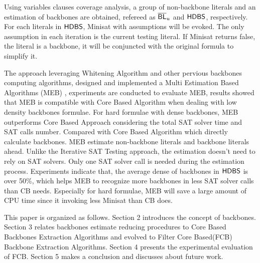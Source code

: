 Using variables clauses coverage analysis, a group of non-backbone literals and an estimation of backbones are obtained, refereed as $\overline{\textsf{BL}}_u$ and $\textsf{HDBS}$, respectively. For each literals in $\textsf{HDBS}$, Minisat with assumptions will be evoked. The only assumption in each iteration is the current testing literal. If Minisat returns false, the literal is a backbone, it will be conjuncted with the original formula to simplify it.

The approach leveraging Whitening Algorithm and other pervious backbones computing algorithms, designed and implemented a Multi Estimation Based Algorithms (MEB) , experiments are conducted to evaluate MEB, results showed that MEB is compatible with Core Based Algorithm when dealing with low density backbones formulae. For hard formulae with dense backbones, MEB outperforms Core Based Approach considering the total SAT solver time and SAT calls number.
Compared with Core Based Algorithm which directly calculate backbones. MEB estimate non-backbone literals and backbone literals ahead.
Unlike the Iterative SAT Testing approach, the estimation doesn't need to rely on SAT solvers. Only one SAT solver call is needed during the estimation process. 
Experiments indicate that, the average dense of backbones in $\textsf{HDBS}$ is over 50\%, which helps MEB to recognize more backbones in less SAT solver calls than CB needs. Especially for hard formulae, MEB will save a large amount of CPU time since it invoking less Minisat than CB does.

This paper is organized as follows.
Section 2 introduces the concept of backbones.
Section 3 relates backbones estimate reducing procedures to Core Based Backbones Extraction Algorithms and evolved to Filter Core Based(FCB) Backbone Extraction Algorithms.
Section 4 presents the experimental evaluation of FCB.
Section 5 makes a conclusion and discusses about future work.
